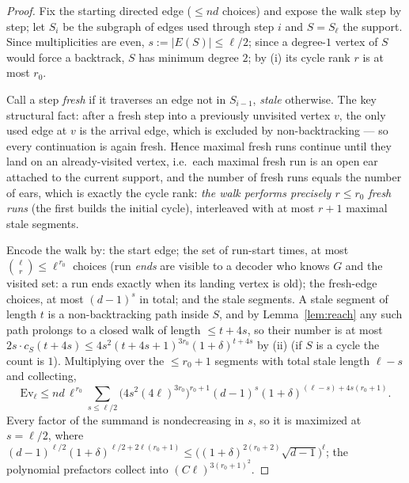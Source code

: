 \documentclass[11pt]{article}
\theoremstyle{remark}
\begin{document}
\begin{proof}
Fix the starting directed edge ($\le nd$ choices) and expose the walk
step by step; let $S_i$ be the subgraph of edges used through step $i$
and $S=S_{\ell}$ the support. Since multiplicities are even,
$s:=|E(S)|\le\ell/2$; since a degree-$1$ vertex of $S$ would force a
backtrack, $S$ has minimum degree $2$; by (i) its cycle rank $r$ is at
most $r_0$.

Call a step \emph{fresh} if it traverses an edge not in $S_{i-1}$,
\emph{stale} otherwise. The key structural fact: after a fresh step
into a previously unvisited vertex $v$, the only used edge at $v$ is
the arrival edge, which is excluded by non-backtracking --- so every
continuation is again fresh. Hence maximal fresh runs continue until
they land on an already-visited vertex, i.e.\ each maximal fresh run is
an open ear attached to the current support, and the number of fresh
runs equals the number of ears, which is exactly the cycle rank:
\emph{the walk performs precisely $r\le r_0$ fresh runs} (the first
builds the initial cycle), interleaved with at most $r+1$ maximal stale
segments.

Encode the walk by: the start edge; the set of run-start times, at most
$\binom{\ell}{r}\le\ell^{\,r_0}$ choices (run \emph{ends} are visible
to a decoder who knows $G$ and the visited set: a run ends exactly when
its landing vertex is old); the fresh-edge choices, at most $(d-1)^{s}$
in total; and the stale segments. A stale segment of length $t$ is a
non-backtracking path inside $S$, and by Lemma~\ref{lem:reach} any such
path prolongs to a closed walk of length $\le t+4s$, so their number is
at most $2s\cdot c_S(t+4s)\le 4s^2(t+4s+1)^{3r_0}(1+\delta)^{t+4s}$ by
(ii) (if $S$ is a cycle the count is $1$). Multiplying over the
$\le r_0+1$ segments with total stale length $\ell-s$ and collecting,
\[
\mathrm{Ev}_\ell\le nd\,\ell^{\,r_0}\!\!\sum_{s\le\ell/2}\!
\big(4s^2(4\ell)^{3r_0}\big)^{r_0+1}
(d-1)^{s}(1+\delta)^{(\ell-s)+4s(r_0+1)} .
\]
Every factor of the summand is nondecreasing in $s$, so it is maximized
at $s=\ell/2$, where
$(d-1)^{\ell/2}(1+\delta)^{\ell/2+2\ell(r_0+1)}\le
\big((1+\delta)^{2(r_0+2)}\sqrt{d-1}\big)^{\ell}$; the polynomial
prefactors collect into $(C\ell)^{3(r_0+1)^2}$.
\end{proof}
\end{document}
